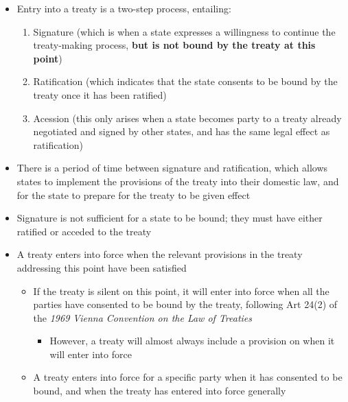 \begin{itemize}
    \item Entry into a treaty is a two-step process, entailing:
    \begin{enumerate}
        \item Signature (which is when a state expresses a willingness to continue the treaty-making process, \textbf{but is not bound by the treaty at this point})
        \item Ratification (which indicates that the state consents to be bound by the treaty once it has been ratified)
        \item Acession (this only arises when a state becomes party to a treaty already negotiated and signed by other states, and has the same legal effect as ratification)
    \end{enumerate}
    \item There is a period of time between signature and ratification, which allows states to implement the provisions of the treaty into their domestic law, and for the state to prepare for the treaty to be given effect
    \item Signature is not sufficient for a state to be bound; they must have either ratified or acceded to the treaty
    \item A treaty enters into force when the relevant provisions in the treaty addressing this point have been satisfied
    \begin{itemize}
        \item If the treaty is silent on this point, it will enter into force when all the parties have consented to be bound by the treaty, following Art 24(2) of the \textit{1969 Vienna Convention on the Law of Treaties}
        \begin{itemize}
            \item However, a treaty will almost always include a provision on when it will enter into force
        \end{itemize}
        \item A treaty enters into force for a specific party when it has consented to be bound, and when the treaty has entered into force generally
    \end{itemize}
\end{itemize}

